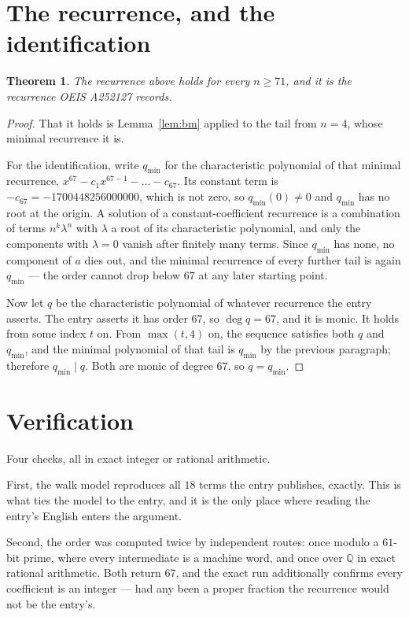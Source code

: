 \documentclass[11pt,a4paper]{article}
\theoremstyle{plain}
\newtheorem{theorem}{Theorem}
\theoremstyle{definition}
\begin{document}
\section{The recurrence, and the identification}

\begin{theorem}
The recurrence above holds for every $n\ge71$, and it is the recurrence OEIS A252127 records.
\end{theorem}

\begin{proof}
That it holds is Lemma~\ref{lem:bm} applied to the tail from $n=4$, whose minimal
recurrence it is.

For the identification, write $q_{\min}$ for the characteristic polynomial of that minimal
recurrence, $x^{67}-c_1x^{67-1}-\dots-c_{67}$. Its constant term is
$-c_{67}=-1700448256000000$, which is not zero, so $q_{\min}(0)\neq0$ and $q_{\min}$ has no
root at the origin. A solution of a constant-coefficient recurrence is a combination of terms
$n^{k}\lambda^{n}$ with $\lambda$ a root of its characteristic polynomial, and only the
components with $\lambda=0$ vanish after finitely many terms. Since $q_{\min}$ has none, no
component of $a$ dies out, and the minimal recurrence of every further tail is again
$q_{\min}$ --- the order cannot drop below $67$ at any later starting point.

Now let $q$ be the characteristic polynomial of whatever recurrence the entry asserts. The
entry asserts it has order $67$, so $\deg q=67$, and it is monic. It holds from some
index $t$ on. From $\max(t,4)$ on, the sequence satisfies both $q$ and $q_{\min}$, and
the minimal polynomial of that tail is $q_{\min}$ by the previous paragraph; therefore
$q_{\min}\mid q$. Both are monic of degree $67$, so $q=q_{\min}$.
\end{proof}

\section{Verification}

Four checks, all in exact integer or rational arithmetic.

First, the walk model reproduces all $18$ terms the entry publishes, exactly. This is
what ties the model to the entry, and it is the only place where reading the entry's English
enters the argument.

Second, the order was computed twice by independent routes: once modulo a $61$-bit prime, where
every intermediate is a machine word, and once over $\mathbb{Q}$ in exact rational arithmetic.
Both return $67$, and the exact run additionally confirms every coefficient is an integer
--- had any been a proper fraction the recurrence would not be the entry's.
\end{document}
